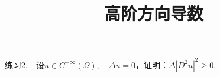 \documentclass{article}
\title{高阶方向导数}
\author{}
\date{}
\begin{document}
\maketitle

练习2.\ \ 设\(u \in C^{ + \infty }(\Omega ),\quad \Delta u = 0\)，证明：\(\Delta | D^{2}u |^2 \ge 0 \).
\end{document}

